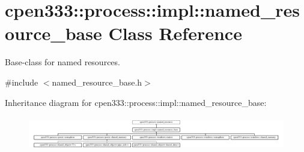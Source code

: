 \hypertarget{classcpen333_1_1process_1_1impl_1_1named__resource__base}{}\section{cpen333\+:\+:process\+:\+:impl\+:\+:named\+\_\+resource\+\_\+base Class Reference}
\label{classcpen333_1_1process_1_1impl_1_1named__resource__base}


Base-\/class for named resources.  




{\ttfamily \#include $<$named\+\_\+resource\+\_\+base.\+h$>$}

Inheritance diagram for cpen333\+:\+:process\+:\+:impl\+:\+:named\+\_\+resource\+\_\+base\+:\begin{figure}[H]
\begin{center}
\leavevmode
\includegraphics[height=1.493333cm]{classcpen333_1_1process_1_1impl_1_1named__resource__base}
\end{center}
\end{figure}
